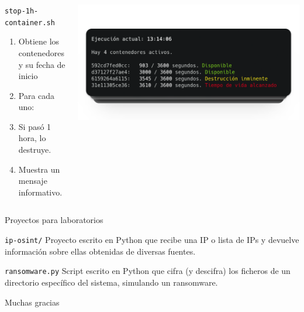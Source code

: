     \begin{frame}
        \begin{columns}[c]
                \begin{block}{\texttt{stop-1h-container.sh}}
                    \scriptsize

            \begin{enumerate}
                \item {Obtiene los contenedores\\y su fecha de inicio}
                \item Para cada uno:
                \item Si pasó 1 hora, lo destruye.
                \item Muestra un mensaje informativo.
            \end{enumerate}
                \end{block}
            
                \includegraphics[scale=0.2]{images/capturas/cron.png}
        \end{columns}
    \end{frame}

    \begin{frame}{Proyectos para laboratorios}

        \begin{block}{\texttt{ip-osint/}}
            Proyecto escrito en Python que recibe una IP o lista de IPs y devuelve información sobre ellas obtenidas de diversas fuentes.
        \end{block}
    \end{frame}

    \begin{frame}

        \begin{block}{\texttt{ransomware.py}}
            Script escrito en Python que cifra (y descifra) los ficheros de un directorio específico del sistema, simulando un ransomware.
        \end{block}
    \end{frame}

    \begin{frame}
        \Huge{\centerline{Muchas gracias}}
    \end{frame}
